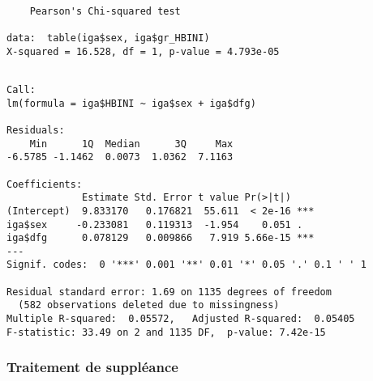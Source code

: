 \documentclass[11pt,a4paper]{article}\usepackage[]{graphicx}\usepackage[]{color}
\makeatletter
\newenvironment{kframe}{%
 \def\at@end@of@kframe{}%
 \ifinner\ifhmode%
  \def\at@end@of@kframe{\end{minipage}}%
  \begin{minipage}{\columnwidth}%
 \fi\fi%
 \def\FrameCommand##1{\hskip\@totalleftmargin \hskip-\fboxsep
 \colorbox{shadecolor}{##1}\hskip-\fboxsep
     \hskip-\linewidth \hskip-\@totalleftmargin \hskip\columnwidth}%
 \MakeFramed {\advance\hsize-\width
   \@totalleftmargin\z@ \linewidth\hsize
   \@setminipage}}%
 {\par\unskip\endMakeFramed%
 \at@end@of@kframe}
\newenvironment{knitrout}{}{} %
\makeatother
\begin{document}
\begin{knitrout}
\color{fgcolor}\begin{kframe}
\begin{verbatim}

	Pearson's Chi-squared test

data:  table(iga$sex, iga$gr_HBINI)
X-squared = 16.528, df = 1, p-value = 4.793e-05
\end{verbatim}
\end{kframe}
\end{knitrout}


\begin{knitrout}
\color{fgcolor}\begin{kframe}
\begin{verbatim}

Call:
lm(formula = iga$HBINI ~ iga$sex + iga$dfg)

Residuals:
    Min      1Q  Median      3Q     Max 
-6.5785 -1.1462  0.0073  1.0362  7.1163 

Coefficients:
             Estimate Std. Error t value Pr(>|t|)    
(Intercept)  9.833170   0.176821  55.611  < 2e-16 ***
iga$sex     -0.233081   0.119313  -1.954    0.051 .  
iga$dfg      0.078129   0.009866   7.919 5.66e-15 ***
---
Signif. codes:  0 '***' 0.001 '**' 0.01 '*' 0.05 '.' 0.1 ' ' 1

Residual standard error: 1.69 on 1135 degrees of freedom
  (582 observations deleted due to missingness)
Multiple R-squared:  0.05572,	Adjusted R-squared:  0.05405 
F-statistic: 33.49 on 2 and 1135 DF,  p-value: 7.42e-15
\end{verbatim}
\end{kframe}
\end{knitrout}


    \subsubsection{Traitement de suppléance}
\end{document}
